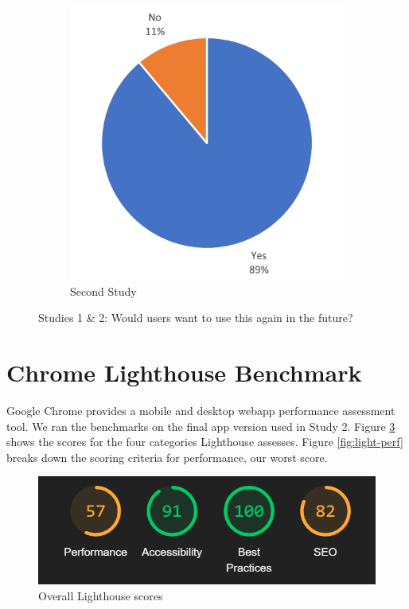\documentclass[thesis]{fputhesis}
\begin{document}
\begin{body}
\begin{figure}[h]
\begin{subfigure}[]{.45\textwidth}
        \includegraphics[width=\textwidth]{Images/future use study 2.png}
        \caption{Second Study}
        \label{fig:future2}
    \end{subfigure}
    \caption{Studies 1 \& 2: Would users want to use this again in the future?}
    \label{fig:future-use}
\end{figure}

\pagebreak
\section{Chrome Lighthouse Benchmark}
Google Chrome provides a mobile and desktop webapp performance assessment tool. We ran the benchmarks on the final app version used in Study 2. Figure \ref{fig:light-scores} shows the scores for the four categories Lighthouse assesses. Figure \ref{fig:light-perf} breaks down the scoring criteria for performance, our worst score. 
\begin{figure}[h]
    \centering
    \includegraphics[width=0.7\linewidth]{Images/lighthouse scores.png}
    \caption{Overall Lighthouse scores}
    \label{fig:light-scores}
\end{figure}


\end{body}
\end{document}
